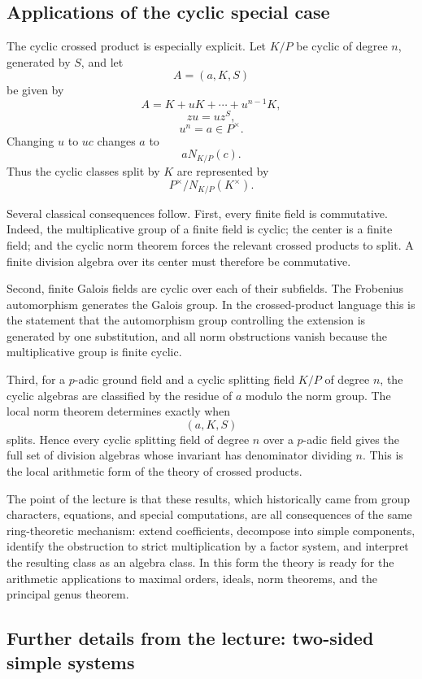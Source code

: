 \documentclass[11pt]{article}
\begin{document}
\subsection{Applications of the cyclic special case}

The cyclic crossed product is especially explicit. Let \(K/P\) be cyclic of degree \(n\), generated by \(S\), and let
\[
  A=(a,K,S)
\]
be given by
\[
  A=K+uK+
\cdots+u^{n-1}K,
\]
\[
  zu=uz^S,
\]
\[
  u^n=a\in P^{\times}.
\]
Changing \(u\) to \(uc\) changes \(a\) to
\[
  aN_{K/P}(c).
\]
Thus the cyclic classes split by \(K\) are represented by
\[
  P^{\times}/N_{K/P}(K^{\times}).
\]

Several classical consequences follow. First, every finite field is commutative. Indeed, the multiplicative group of a finite field is cyclic; the center is a finite field; and the cyclic norm theorem forces the relevant crossed products to split. A finite division algebra over its center must therefore be commutative.

Second, finite Galois fields are cyclic over each of their subfields. The Frobenius automorphism generates the Galois group. In the crossed-product language this is the statement that the automorphism group controlling the extension is generated by one substitution, and all norm obstructions vanish because the multiplicative group is finite cyclic.

Third, for a \(p\)-adic ground field and a cyclic splitting field \(K/P\) of degree \(n\), the cyclic algebras are classified by the residue of \(a\) modulo the norm group. The local norm theorem determines exactly when
\[
  (a,K,S)
\]
splits. Hence every cyclic splitting field of degree \(n\) over a \(p\)-adic field gives the full set of division algebras whose invariant has denominator dividing \(n\). This is the local arithmetic form of the theory of crossed products.

The point of the lecture is that these results, which historically came from group characters, equations, and special computations, are all consequences of the same ring-theoretic mechanism: extend coefficients, decompose into simple components, identify the obstruction to strict multiplication by a factor system, and interpret the resulting class as an algebra class. In this form the theory is ready for the arithmetic applications to maximal orders, ideals, norm theorems, and the principal genus theorem.



\subsection{Further details from the lecture: two-sided simple systems}
\end{document}
